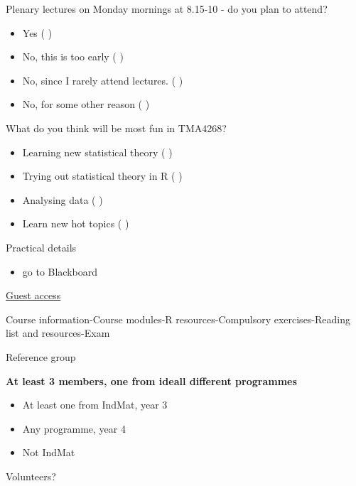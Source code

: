 \documentclass[10pt,ignorenonframetext,]{beamer}
\providecommand{\tightlist}{%
  \setlength{\itemsep}{0pt}\setlength{\parskip}{0pt}}
\begin{document}
\begin{frame}

\begin{block}{Plenary lectures on Monday mornings at 8.15-10 - do you
plan to attend?}

\begin{itemize}
\tightlist
\item
  Yes ( )
\item
  No, this is too early ( )
\item
  No, since I rarely attend lectures. ( )
\item
  No, for some other reason ( )
\end{itemize}

\end{block}

\begin{block}{What do you think will be most fun in TMA4268?}

\begin{itemize}
\tightlist
\item
  Learning new statistical theory ( )
\item
  Trying out statistical theory in R ( )
\item
  Analysing data ( )
\item
  Learn new hot topics ( )
\end{itemize}

\end{block}

\end{frame}

\begin{frame}{Practical details}

\begin{itemize}
\tightlist
\item
  go to Blackboard
\end{itemize}

\href{https://ntnu.blackboard.com/webapps/blackboard/execute/modulepage/view?course_id=_7960_1\&cmp_tab_id=_40192_1\&mode=view}{Guest
access}

Course information-Course modules-R resources-Compulsory
exercises-Reading list and resources-Exam

\end{frame}

\begin{frame}{Reference group}

\textbf{At least 3 members, one from ideall different programmes}

\begin{itemize}
\tightlist
\item
  At least one from IndMat, year 3
\item
  Any programme, year 4
\item
  Not IndMat
\end{itemize}

Volunteers?

\end{frame}
\end{document}
